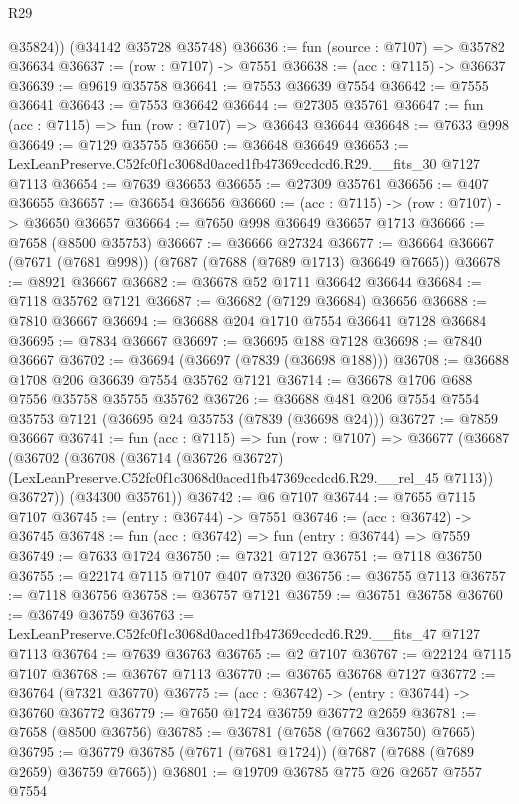 \begin{lexlean}{R29}
\begin{coremodule}
        @35824))
    (@34142 @35728 @35748)
@36636 := fun (source : @7107) => @35782 @36634
@36637 := (row : @7107) -> @7551
@36638 := (acc : @7115) -> @36637
@36639 := @9619 @35758
@36641 := @7553 @36639 @7554
@36642 := @7555 @36641
@36643 := @7553 @36642
@36644 := @27305 @35761
@36647 := fun (acc : @7115) => fun (row : @7107) => @36643 @36644
@36648 := @7633 @998
@36649 := @7129 @35755
@36650 := @36648 @36649
@36653 := LexLeanPreserve.C52fc0f1c3068d0aced1fb47369ccdcd6.R29.__fits_30 @7127 @7113
@36654 := @7639 @36653
@36655 := @27309 @35761
@36656 := @407 @36655
@36657 := @36654 @36656
@36660 := (acc : @7115) -> (row : @7107) -> @36650 @36657
@36664 := @7650 @998 @36649 @36657 @1713
@36666 := @7658 (@8500 @35753)
@36667 := @36666 @27324
@36677 := @36664 @36667 (@7671 (@7681 @998)) (@7687 (@7688 (@7689 @1713) @36649 @7665))
@36678 := @8921 @36667
@36682 := @36678 @52 @1711 @36642 @36644
@36684 := @7118 @35762 @7121
@36687 := @36682 (@7129 @36684) @36656
@36688 := @7810 @36667
@36694 := @36688 @204 @1710 @7554 @36641 @7128 @36684
@36695 := @7834 @36667
@36697 := @36695 @188 @7128
@36698 := @7840 @36667
@36702 := @36694 (@36697 (@7839 (@36698 @188)))
@36708 := @36688 @1708 @206 @36639 @7554 @35762 @7121
@36714 := @36678 @1706 @688 @7556 @35758 @35755 @35762
@36726 := @36688 @481 @206 @7554 @7554 @35753 @7121 (@36695 @24 @35753 (@7839 (@36698 @24)))
@36727 := @7859 @36667
@36741 := fun (acc : @7115) =>
  fun (row : @7107) =>
  @36677
    (@36687
      (@36702
        (@36708
          (@36714
            (@36726 @36727)
            (LexLeanPreserve.C52fc0f1c3068d0aced1fb47369ccdcd6.R29.__rel_45 @7113))
          @36727))
      (@34300 @35761))
@36742 := @6 @7107
@36744 := @7655 @7115 @7107
@36745 := (entry : @36744) -> @7551
@36746 := (acc : @36742) -> @36745
@36748 := fun (acc : @36742) => fun (entry : @36744) => @7559
@36749 := @7633 @1724
@36750 := @7321 @7127
@36751 := @7118 @36750
@36755 := @22174 @7115 @7107 @407 @7320
@36756 := @36755 @7113
@36757 := @7118 @36756
@36758 := @36757 @7121
@36759 := @36751 @36758
@36760 := @36749 @36759
@36763 := LexLeanPreserve.C52fc0f1c3068d0aced1fb47369ccdcd6.R29.__fits_47 @7127 @7113
@36764 := @7639 @36763
@36765 := @2 @7107
@36767 := @22124 @7115 @7107
@36768 := @36767 @7113
@36770 := @36765 @36768 @7127
@36772 := @36764 (@7321 @36770)
@36775 := (acc : @36742) -> (entry : @36744) -> @36760 @36772
@36779 := @7650 @1724 @36759 @36772 @2659
@36781 := @7658 (@8500 @36756)
@36785 := @36781 (@7658 (@7662 @36750) @7665)
@36795 := @36779 @36785 (@7671 (@7681 @1724)) (@7687 (@7688 (@7689 @2659) @36759 @7665))
@36801 := @19709 @36785 @775 @26 @2657 @7557 @7554

\end{coremodule}
\end{lexlean}
